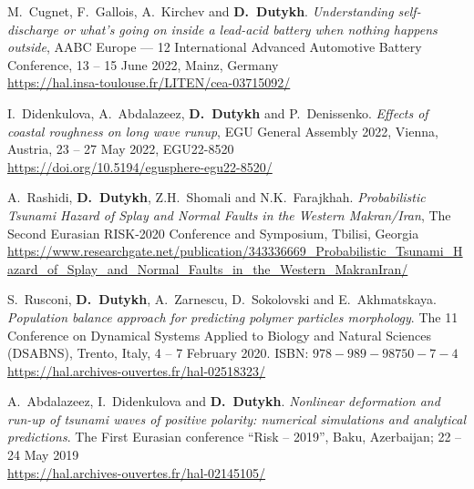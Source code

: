 \begin{etaremune}
  \item M.~Cugnet, F.~Gallois, A.~Kirchev and \textbf{D.~Dutykh}. \textit{Understanding self-discharge or what's going on inside a lead-acid battery when nothing happens outside}, AABC Europe --- 12 International Advanced Automotive Battery Conference, 13 -- 15 June 2022, Mainz, Germany \\
  \url{https://hal.insa-toulouse.fr/LITEN/cea-03715092/}
  
  \item I.~Didenkulova, A.~Abdalazeez, \textbf{D.~Dutykh} and P.~Denissenko. \textit{Effects of coastal roughness on long wave runup}, EGU General Assembly 2022, Vienna, Austria, 23 -- 27 May 2022, EGU22-8520 \\
  \url{https://doi.org/10.5194/egusphere-egu22-8520/}


  
  \item A.~Rashidi, \textbf{D.~Dutykh}, Z.H.~Shomali and N.K.~Farajkhah. \textit{Probabilistic Tsunami Hazard of Splay and Normal Faults in the Western Makran/Iran}, The Second Eurasian RISK-2020 Conference and Symposium, Tbilisi, Georgia \\ %
  \url{https://www.researchgate.net/publication/343336669_Probabilistic_Tsunami_Hazard_of_Splay_and_Normal_Faults_in_the_Western_MakranIran/}
  
  \item S.~Rusconi, \textbf{D.~Dutykh}, A.~Zarnescu, D.~Sokolovski and E.~Akhmatskaya. \textit{Population balance approach for predicting polymer particles morphology}. The 11 Conference on Dynamical Systems Applied to Biology and Natural Sciences (DSABNS), Trento, Italy, 4 -- 7 February 2020. ISBN: $978-989-98750-7-4$ \\ %
  \url{https://hal.archives-ouvertes.fr/hal-02518323/}



  \item A.~Abdalazeez, I.~Didenkulova and \textbf{D.~Dutykh}. \textit{Nonlinear deformation and run-up of tsunami waves of positive polarity: numerical simulations and analytical predictions}. The First Eurasian conference ``Risk -- 2019'', Baku, Azerbaijan; 22 -- 24 May 2019 \\ %
  \url{https://hal.archives-ouvertes.fr/hal-02145105/}
  

\end{etaremune}
